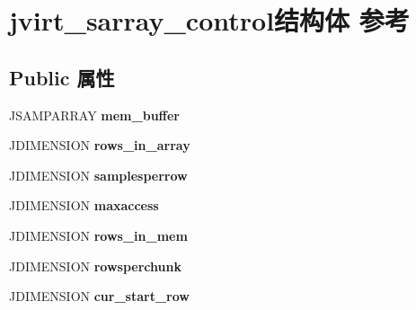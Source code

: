 \hypertarget{structjvirt__sarray__control}{}\section{jvirt\+\_\+sarray\+\_\+control结构体 参考}
\label{structjvirt__sarray__control}
\subsection*{Public 属性}
\begin{DoxyCompactItemize}
\item 
\mbox{\label{structjvirt__sarray__control_abc1f86c02141d80dc5d443e57a1d36d6}} 
J\+S\+A\+M\+P\+A\+R\+R\+AY {\bfseries mem\+\_\+buffer}
\item 
\mbox{\label{structjvirt__sarray__control_a17d42465a9cedfd4feeb93edfd8d134a}} 
J\+D\+I\+M\+E\+N\+S\+I\+ON {\bfseries rows\+\_\+in\+\_\+array}
\item 
\mbox{\label{structjvirt__sarray__control_a3b6c756c3a71dc8023672093a60cc4f1}} 
J\+D\+I\+M\+E\+N\+S\+I\+ON {\bfseries samplesperrow}
\item 
\mbox{\label{structjvirt__sarray__control_a719350d4faf724c6617a5892aae8ec2a}} 
J\+D\+I\+M\+E\+N\+S\+I\+ON {\bfseries maxaccess}
\item 
\mbox{\label{structjvirt__sarray__control_aac15348d4b307c8aacc631b96aa3b547}} 
J\+D\+I\+M\+E\+N\+S\+I\+ON {\bfseries rows\+\_\+in\+\_\+mem}
\item 
\mbox{\label{structjvirt__sarray__control_ad1c55661955e1600d447ad754c6aece1}} 
J\+D\+I\+M\+E\+N\+S\+I\+ON {\bfseries rowsperchunk}
\item 
\mbox{\label{structjvirt__sarray__control_a84ae28e5bf362228d7f43b486239e873}} 
J\+D\+I\+M\+E\+N\+S\+I\+ON {\bfseries cur\+\_\+start\+\_\+row}
\item 
\mbox{\label{structjvirt__sarray__control_a049e8066e21d2fca662be25e4365259a}} 

\end{DoxyCompactItemize}
